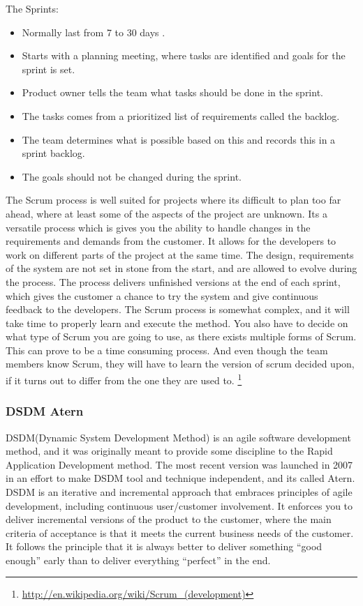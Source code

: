The Sprints:
\begin{itemize}

\item Normally last from 7 to 30 days .
\item Starts with a planning meeting, where tasks are identified and goals for the sprint is set.
\item Product owner tells the team what tasks should be done in the sprint.
\item The tasks comes from a prioritized list of requirements called the backlog.
\item The team determines what is possible based on this and records this in a sprint backlog.
\item The goals should not be changed during the sprint.

\end{itemize}

The Scrum process is well suited for projects where its difficult to plan too far ahead, where at least some of the aspects of the project are unknown. Its a versatile process which is gives you the ability to handle changes in the requirements and demands from the customer. It allows for the developers to work on different parts of the project at the same time. The design, requirements of the system are not set in stone from the start, and are allowed to evolve during the process. The process delivers unfinished versions at the end of each sprint, which gives the customer a chance to try the system and give continuous feedback to the developers. The Scrum process is somewhat complex, and it will take time to properly learn and execute the method. You also have to decide on what type of Scrum you are going to use, as there exists multiple forms of Scrum. This can prove to be a time consuming process. And even though the team members know Scrum, they will have to learn the version of scrum decided upon, if it turns out to differ from the one they are used to.
\footnote{\url{http://en.wikipedia.org/wiki/Scrum_(development)}}

\subsubsection{DSDM Atern}
DSDM(Dynamic System Development Method) is an agile software development method, and it was originally meant to provide some discipline to the Rapid Application Development method. The most recent version was launched in 2007 in an effort to make DSDM tool and technique independent, and its called Atern. DSDM is an iterative and incremental approach that embraces principles of agile development, including continuous user/customer involvement. It enforces you to deliver incremental versions of the product to the customer, where the main criteria of acceptance is that it meets the current business needs of the customer. It follows the principle that it is always better to deliver something “good enough” early than to deliver everything “perfect” in the end.

